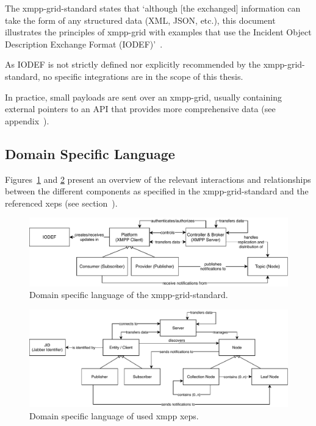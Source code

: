 The \gls{xmpp-grid-standard} states that `although [the exchanged] information can take the form of any structured data (XML, JSON, etc.), this document illustrates the principles of \gls{xmpp-grid} with examples that use the Incident Object Description Exchange Format (IODEF)'~\cite{rfc7970, ietf-mile-xmpp-grid-05}.

As IODEF is not strictly defined nor explicitly recommended by the \gls{xmpp-grid-standard}, no specific integrations are in the scope of this thesis.

In practice, small payloads are sent over an \gls{xmpp-grid}, usually containing external pointers to an API that provides more comprehensive data (see appendix~).

\subsection{Domain Specific Language}

Figures~\ref{fig:architecturedslgriddraft} and \ref{fig:architecturedslxeps} present an overview of the relevant interactions and relationships between the different components as specified in the \gls{xmpp-grid-standard} and the referenced \glspl{xep} (see section~).

\begin{figure}[h]
\centering
\includegraphics[width=\linewidth]{resources/architecture_dsl_grid_draft}
\caption[DSL of the XMPP-Grid standard]{Domain specific language of the \gls{xmpp-grid-standard}.}
\label{fig:architecturedslgriddraft}
\end{figure}

\begin{figure}[h]
\centering
\includegraphics[width=\linewidth]{resources/architecture_dsl_xeps}
\caption[DSL of used XMPP XEPs]{Domain specific language of used \gls{xmpp} \glspl{xep}.}
\label{fig:architecturedslxeps}
\end{figure}

